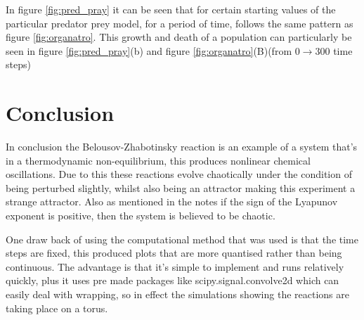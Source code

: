 \documentclass[12pt, A4]{article}
\begin{document}
In figure \ref{fig:pred_pray} it can be seen that for certain starting values of the particular 
predator prey model, for a period of time, follows the same pattern as figure \ref{fig:organatro}.
This growth and death of a population can particularly be seen in figure \ref{fig:pred_pray}(b) and 
figure \ref{fig:organatro}(B)(from $0\rightarrow 300$ time steps)

\section{Conclusion} %
\label{sec:Conclusion}

In conclusion the Belousov-Zhabotinsky reaction is an example of a system that's in a thermodynamic 
non-equilibrium, this produces nonlinear chemical oscillations. Due to this these reactions 
evolve chaotically under the condition of being perturbed slightly, whilst also 
being an attractor making this experiment a strange attractor. Also as mentioned in the notes 
if the sign of the Lyapunov exponent is positive, then the system is believed to be chaotic.

One draw back of using the computational method that was used is that the time steps 
are fixed, this produced plots that are more quantised rather than being continuous. 
The advantage is that it's simple to implement and runs relatively quickly, plus it 
uses pre made packages like scipy.signal.convolve2d which can easily deal with wrapping, so in 
effect the simulations showing the reactions are taking place on a torus.



\end{document}
